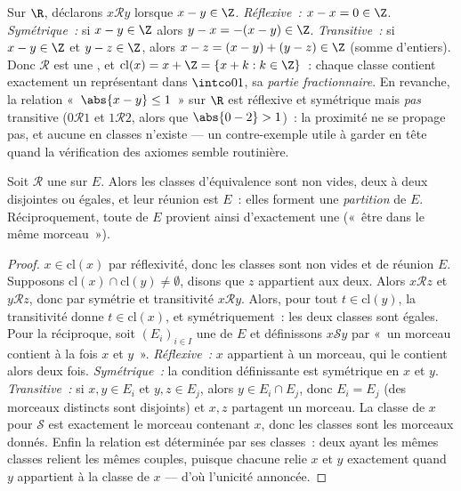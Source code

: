\begin{example}\label{ex:b1:logic:fracpart}
Sur $\R$, déclarons $x \mathbin{\mathcal{R}} y$ lorsque $x - y \in \Z$.
\emph{Réflexive~:} $x - x = 0 \in \Z$. \emph{Symétrique~:} si $x - y
\in \Z$ alors $y - x = -(x - y) \in \Z$. \emph{Transitive~:} si $x -
y \in \Z$ et $y - z \in \Z$, alors $x - z = (x - y) + (y - z) \in
\Z$ (somme d'entiers). Donc $\mathcal R$ est une , et $\mathrm{cl}(x) = x + \Z = \{x + k : k \in \Z\}$~:
chaque classe contient exactement un représentant dans $\intco01$, sa
\emph{partie fractionnaire}. En revanche, la relation «~$\abs{x - y}
\leq 1$~» sur $\R$ est réflexive et symétrique mais \emph{pas}
transitive ($0 \mathbin{\mathcal R} 1$ et $1 \mathbin{\mathcal R}
2$, alors que $\abs{0 - 2} > 1$)~: la proximité ne se propage pas, et
aucune  en classes n'existe --- un contre-exemple utile à
garder en tête quand la vérification des axiomes semble routinière.
\end{example}

\begin{theorem}\label{thm:b1:logic:partition}
Soit $\mathcal{R}$ une  sur $E$. Alors les classes
d'équivalence sont non vides, deux à deux disjointes ou égales, et leur
réunion est $E$~: elles forment une \emph{partition} de
$E$. Réciproquement, toute  de $E$ provient ainsi d'exactement
une  («~être dans le même morceau~»).
\end{theorem}

\begin{proof}
$x \in \mathrm{cl}(x)$ par réflexivité, donc les classes sont non vides
et de réunion $E$. Supposons $\mathrm{cl}(x) \cap \mathrm{cl}(y) \neq
\emptyset$, disons que $z$ appartient aux deux. Alors $x
\mathbin{\mathcal{R}} z$ et $y \mathbin{\mathcal{R}} z$, donc par
symétrie et transitivité $x \mathbin{\mathcal{R}} y$. Alors, pour tout
$t \in \mathrm{cl}(y)$, la transitivité donne $t \in \mathrm{cl}(x)$, et
symétriquement~: les deux classes sont égales. Pour la réciproque, soit
$(E_i)_{i \in I}$ une  de $E$ et définissons
$x \mathbin{\mathcal S} y$ par «~un morceau contient à la fois $x$ et
$y$~». \emph{Réflexive~:} $x$ appartient à un morceau, qui le contient
alors deux fois. \emph{Symétrique~:} la condition définissante est
symétrique en $x$ et $y$. \emph{Transitive~:} si $x, y \in E_i$ et
$y, z \in E_j$, alors $y \in E_i \cap E_j$, donc $E_i = E_j$ (des
morceaux distincts sont disjoints) et $x, z$ partagent un morceau. La
classe de $x$ pour $\mathcal S$ est exactement le morceau contenant
$x$, donc les classes sont les morceaux donnés. Enfin la relation est
déterminée par ses classes~: deux  ayant les
mêmes classes relient les mêmes couples, puisque chacune relie $x$ et
$y$ exactement quand $y$ appartient à la classe de $x$ --- d'où
l'unicité annoncée.
\end{proof}

